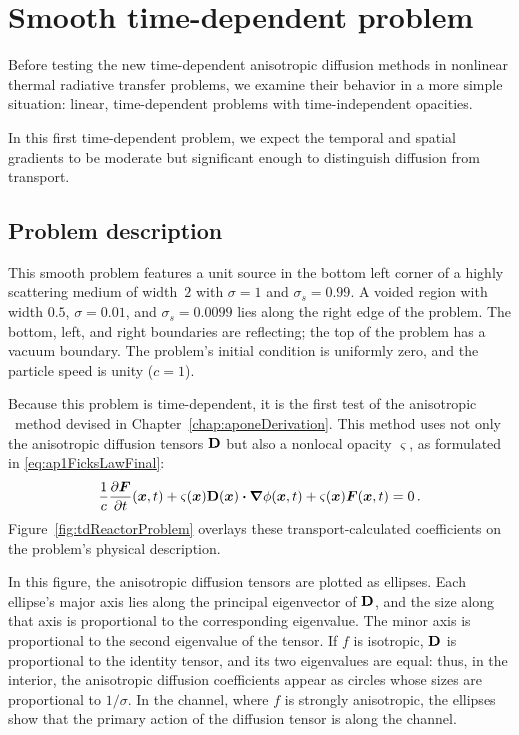 \section{Smooth time-dependent problem}

Before testing the new time-dependent anisotropic diffusion methods in
nonlinear thermal radiative transfer problems, we
examine their behavior in a more simple
situation: linear, time-dependent problems with time-independent opacities.

In this first time-dependent problem, we expect the temporal and spatial
gradients to be moderate but significant enough to distinguish diffusion from
transport.

\subsection{Problem description}

This smooth problem features a unit source in the bottom left corner of a
highly scattering medium of width~$2$ with
$\sigma=1$ and $\sigma_s=0.99$. A voided region with width $0.5$,
$\sigma=0.01$, and $\sigma_s=0.0099$ lies along the right edge of the problem.
The bottom,
left, and right boundaries are reflecting; the top of the problem has a vacuum
boundary. The problem's initial condition is uniformly zero, and the particle
speed is unity ($c=1$).

Because this problem is time-dependent, it is the first test of the anisotropic
\Pone\ method devised in Chapter~\ref{chap:aponeDerivation}. This method
uses not only the anisotropic diffusion tensors $\mathbf{D}$ but also a nonlocal
opacity $\varsigma$, as formulated in \eqref{eq:ap1FicksLawFinal}:
\begin{equation*}
  \frac{1}{c}\frac{\partial \bm{F}}{\partial t}(\bm{x},t)
  + \varsigma(\bm{x}) \mathbf{D}(\bm{x}) \bm{\cdot} \bm{\nabla} \phi(\bm{x}, t)
  + \varsigma(\bm{x})\bm{F}(\bm{x},t) 
  = 0 \,.
\end{equation*}
Figure~\ref{fig:tdReactorProblem} overlays these transport-calculated
coefficients on the problem's physical description.

In this figure, the anisotropic diffusion tensors are plotted as ellipses. Each
ellipse's major axis
lies along the principal eigenvector of $\mathbf{D}$, and the size along that axis is
proportional to the corresponding eigenvalue. The minor axis is proportional to
the second eigenvalue of the tensor. If $f$ is isotropic, $\mathbf{D}$ is
proportional to the identity tensor, and its two eigenvalues are equal: thus, in
the interior, the anisotropic diffusion coefficients appear as circles whose
sizes are proportional to $1/\sigma$. In the channel, where $f$ is strongly
anisotropic, the ellipses show that the primary action of the diffusion
tensor is along the channel.

